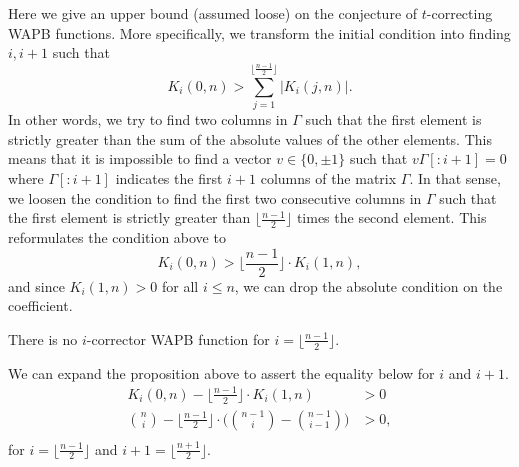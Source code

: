 Here we give an upper bound (assumed loose) on the conjecture of $t$-correcting WAPB functions. More specifically, we transform the initial condition into finding $i, i+1$ such that
$$
K_i(0, n) > \sum_{j = 1}^{\lfloor\frac{n-1}{2}\rfloor}|K_i(j, n)|.
$$
In other words, we try to find two columns in $\Gamma$ such that the first element is strictly greater than the sum of the absolute values of the other elements. This means that it is impossible to find a vector $v \in \{0,\pm1\}$ such that $v\Gamma[:i+1] = 0$ where $\Gamma[:i+1]$ indicates the first $i+1$ columns of the matrix $\Gamma$. In that sense, we loosen the condition to find the first two consecutive columns in $\Gamma$ such that the first element is strictly greater than $\lfloor \frac{n-1}{2} \rfloor$ times the second element. This reformulates the condition above to
$$
K_i(0, n) > \lfloor \frac{n-1}{2} \rfloor \cdot K_i(1, n),
$$
and since $K_i(1, n) > 0$ for all $i \leq n$, we can drop the absolute condition on the coefficient.

\begin{proposition}
There is no $i$-corrector WAPB function for $i = \big\lfloor \frac{n - 1}{2}\big\rfloor$.
\end{proposition}


We can expand the proposition above to assert the equality below for $i$ and $i+1$.
\begin{equation*}
\begin{split}
K_i(0, n) - \bigg\lfloor\frac{n - 1}{2}\bigg\rfloor \cdot K_i(1, n) &> 0\\
\binom{n}{i} - \bigg\lfloor\frac{n - 1}{2}\bigg\rfloor\cdot\Bigg(\binom{n - 1}{i} - \binom{n - 1}{i - 1}\Bigg) &> 0,\\
\end{split}
\end{equation*}
for $i = \big\lfloor \frac{n - 1}{2}\big\rfloor$ and $i +1 = \big\lfloor \frac{n + 1}{2}\big\rfloor$.

